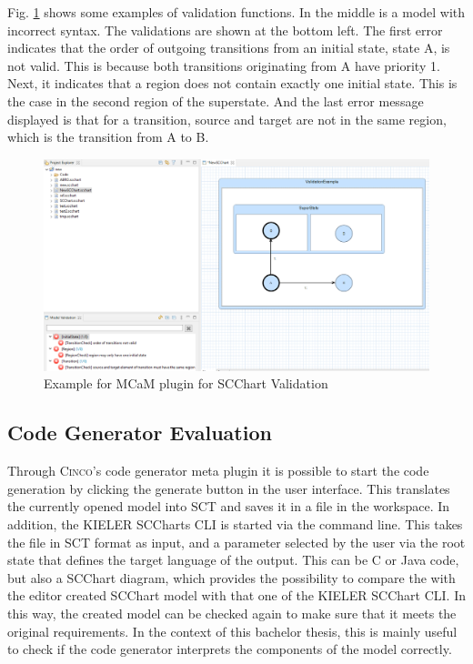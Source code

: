 Fig. \ref{fig:ValidationExample} shows some examples of validation functions. In the middle is a model with incorrect syntax. The validations are shown at the bottom left. The first error indicates that the order of outgoing transitions from an initial state, state A, is not valid. This is because both transitions originating from A have priority 1. Next, it indicates that a region does not contain exactly one initial state. This is the case in the second region of the superstate. And the last error message displayed is that for a transition, source and target are not in the same region, which is the transition from A to B. 
\begin{figure}[h!]
\centering
\includegraphics[width=1.0\textwidth]{bilder/CincoValidationExample.png}
\caption{Example for MCaM plugin for SCChart Validation}
\label{fig:ValidationExample}
\end{figure} 

\subsection{Code Generator Evaluation}

Through \textsc{Cinco}'s code generator meta plugin it is possible to start the code generation by clicking the generate button in the user interface. This translates the currently opened model into SCT and saves it in a file in the workspace. In addition, the KIELER SCCharts CLI is started via the command line. This takes the file in SCT format as input, and a parameter selected by the user via the root state that defines the target language of the output. This can be C or Java code, but also a SCChart diagram, which provides the possibility to compare the with the editor created SCChart model with that one of the KIELER SCChart CLI. In this way, the created model can be checked again to make sure that it meets the original requirements. In the context of this bachelor thesis, this is mainly useful to check if the code generator interprets the components of the model correctly.

